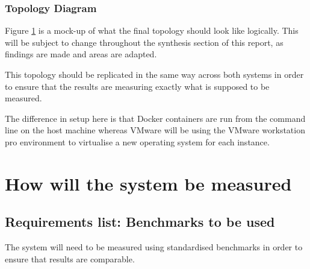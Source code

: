 \subsection{Topology Diagram}
Figure \ref{fig:Topology} is a mock-up of what the final topology should look like logically. This will be subject to change throughout the synthesis section of this report, as findings are made and areas are adapted.
\begin{figure}[H]
\caption{}
\label{fig:Topology}
\centering
\end{figure}

This topology should be replicated in the same way across both systems in order to ensure that the results are measuring exactly what is supposed to be measured.

The difference in setup here is that Docker containers are run from the command line on the host machine whereas VMware will be using the VMware workstation pro environment to virtualise a new operating system for each instance. 

\chapter{How will the system be measured}

\section{Requirements list: Benchmarks to be used}
\label{RequirementsListBench}
The system will need to be measured using standardised benchmarks in order to ensure that results are comparable.

